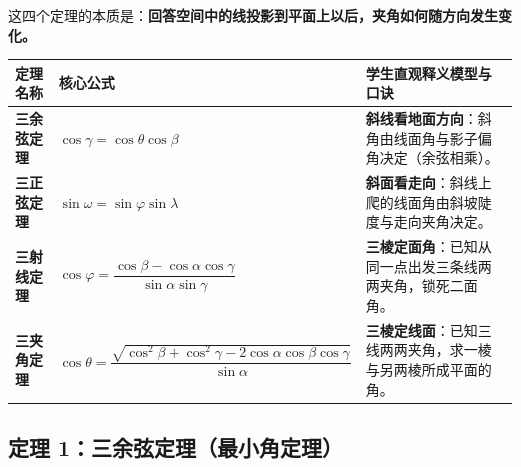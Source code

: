 \documentclass[11pt,a4paper]{ctexart}
\begin{document}
这四个定理的本质是：\textbf{回答空间中的线投影到平面上以后，夹角如何随方向发生变化。}

\begin{center}
\renewcommand{\arraystretch}{1.2}
\begin{tabularx}{\linewidth}{l X X}
\toprule
\textbf{定理名称} & \textbf{核心公式} & \textbf{学生直观释义模型与口诀} \\
\midrule
\textbf{三余弦定理} & $\cos\gamma = \cos\theta \cos\beta$ & \textbf{斜线看地面方向}：斜角由线面角与影子偏角决定（余弦相乘）。 \\
\textbf{三正弦定理} & $\sin\omega = \sin\varphi \sin\lambda$ & \textbf{斜面看走向}：斜线上爬的线面角由斜坡陡度与走向夹角决定。 \\
\textbf{三射线定理} & $\cos\varphi = \dfrac{\cos\beta - \cos\alpha \cos\gamma}{\sin\alpha \sin\gamma}$ & \textbf{三棱定面角}：已知从同一点出发三条线两两夹角，锁死二面角。 \\
\textbf{三夹角定理} & $\cos\theta = \dfrac{\sqrt{\cos^2\beta + \cos^2\gamma - 2\cos\alpha \cos\beta \cos\gamma}}{\sin\alpha}$ & \textbf{三棱定线面}：已知三线两两夹角，求一棱与另两棱所成平面的角。 \\
\bottomrule
\end{tabularx}
\end{center}

\subsection{定理 1：三余弦定理（最小角定理）}
\end{document}
